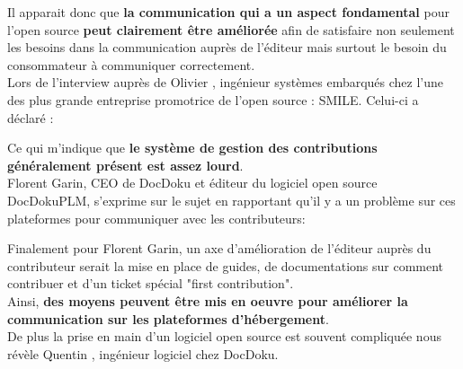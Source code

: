 			Il apparait donc que \textbf{la communication qui a un aspect fondamental} pour l'open source \textbf{peut clairement être améliorée} afin de satisfaire non seulement les besoins dans la communication auprès de l'éditeur mais surtout le besoin du consommateur à communiquer correctement.\\

			Lors de l'interview auprès de Olivier , ingénieur systèmes embarqués chez l'une des plus grande entreprise promotrice de l'open source : SMILE. Celui-ci a déclaré : 

			\begin{center}
				\textit{
				}
			\end{center}

			Ce qui m'indique que \textbf{le système de gestion des contributions généralement présent est assez lourd}.\\

			Florent Garin, CEO de DocDoku et éditeur du logiciel open source DocDokuPLM, s'exprime sur le sujet en rapportant qu'il y a un problème sur ces plateformes pour communiquer avec les contributeurs:

			\begin{center}
				\textit{
				}
			\end{center}

			Finalement pour Florent Garin, un axe d'amélioration de l'éditeur auprès du contributeur serait la mise en place de guides, de documentations sur comment contribuer et d'un ticket spécial "first contribution".\\

			Ainsi, \textbf{des moyens peuvent être mis en oeuvre pour améliorer la communication sur les plateformes d'hébergement}.\\

			De plus la prise en main d'un logiciel open source est souvent compliquée nous révèle Quentin , ingénieur logiciel chez DocDoku.\\

